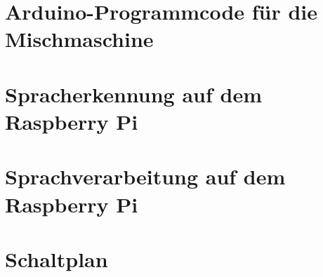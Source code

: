 \chapter{Arduino-Programmcode für die Mischmaschine}\label{Anhang_A}


\chapter{Spracherkennung auf dem Raspberry Pi}\label{Anhang_B}


\chapter{Sprachverarbeitung auf dem Raspberry Pi}\label{Anhang_C}

\chapter{Schaltplan}\label{Anhang_D}
